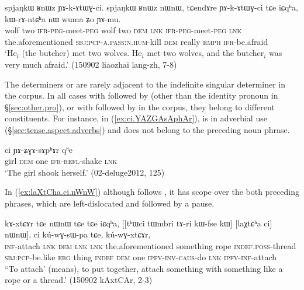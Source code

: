 \begin{exe} 
\ex \label{ex:RnWz.nWnW} 
 \gll spjaŋkɯ ʁnɯz ɲɤ-k-ɤtɯɣ-ci. spjaŋkɯ ʁnɯz nɯnɯ, tɕendɤre ɲɤ-k-ɤtɯɣ-ci tɕe iɕqʰa, kɯ-rɤ-ntɕʰa nɯ wuma ʑo ɲɤ-mu. \\ 
 wolf two \textsc{ifr}-\textsc{peg}-meet-\textsc{peg}  wolf two \textsc{dem} \textsc{lnk} \textsc{ifr}-\textsc{peg}-meet-\textsc{peg} \textsc{lnk} the.aforementioned \textsc{sbj}:\textsc{pcp}-\textsc{a}.\textsc{pass}:\textsc{n}.\textsc{hum}-kill \textsc{dem} really \textsc{emph} \textsc{ifr}-be.afraid \\ 
 \glt `He$_i$ (the butcher) met two wolves. He$_i$ met two wolves, and the butcher$_i$ was very much afraid.' (150902 liaozhai lang-zh, 7-8)
\end{exe}

The determiners  or  are rarely adjacent to the indefinite singular determiner  in the corpus. In all cases with  followed by  (other than the identity pronoun in §\ref{sec:other.pro}), or with  followed by  in the corpus, they belong to different constituents. For instance, in (\ref{ex:ci.YAZGAsAphAr}),  is in adverbial use (§\ref{sec:tense.aspect.adverbs}) and does not belong to the preceding noun phrase.  

\begin{exe}
\ex \label{ex:ci.YAZGAsAphAr}
\gll [tɕʰeme nɯ] ci ɲɤ-ʑɣɤ-sɤpʰɤr qʰe  \\
girl \textsc{dem} one \textsc{ifr}-\textsc{refl}-shake \textsc{lnk} \\
\glt `The girl shook herself.' (02-deluge2012, 125)
\end{exe}

In (\ref{ex:laXtCha.ci.nWnW}) although  follows , it has scope over the both preceding phrases, which are left-dislocated and followed by a pause.

\begin{exe}
\ex \label{ex:laXtCha.ci.nWnW}
\gll  kɤ-xtɕɤr tɕe nɯnɯ tɕe tɕe iɕqʰa, [[tʰɯci tɯmbri tɤ-ri kɯ-fse kɯ] [laχtɕʰa ci] nɯnɯ], ci kú-wɣ-sɯ-pa tɕe, kú-wɣ-xtɕɤr, \\
\textsc{inf}-attach \textsc{lnk} \textsc{dem} \textsc{lnk} \textsc{lnk} the.aforementioned something rope \textsc{indef}.\textsc{poss}-thread \textsc{sbj}:\textsc{pcp}-be.like \textsc{erg} thing \textsc{indef} \textsc{dem} one \textsc{ipfv}-\textsc{inv}-\textsc{caus}-do \textsc{lnk} \textsc{ipfv}-\textsc{inf}-attach \\
\glt ``To attach' (means), to put together, attach something with something like a rope or a thread.'  (150902 kAxtCAr, 2-3)
\end{exe}

